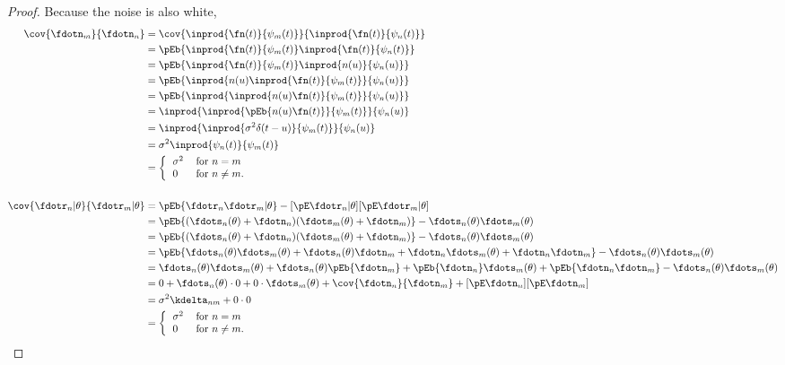 {\begin{proof}
Because the noise is also white,
\begin{align*}
   \cov{\fdotn_m}{\fdotn_n}
      &= \cov{\inprod{\fn(t)}{\psi_m(t)}}{\inprod{\fn(t)}{\psi_n(t)}}
    \\&= \pEb{\inprod{\fn(t)}{\psi_m(t)} \inprod{\fn(t)}{\psi_n(t)}}
    \\&= \pEb{\inprod{\fn(t)}{\psi_m(t)} \inprod{n(u)}{\psi_n(u)}}
    \\&= \pEb{ \inprod{n(u)\inprod{\fn(t)}{\psi_m(t)}}{\psi_n(u)}}
    \\&= \pEb{ \inprod{\inprod{n(u)\fn(t)}{\psi_m(t)}}{\psi_n(u)}}
    \\&= \inprod{\inprod{\pEb{ n(u)\fn(t)}}{\psi_m(t)}}{\psi_n(u)}
    \\&= \inprod{\inprod{\sigma^2 \delta(t-u)}{\psi_m(t)}}{\psi_n(u)}
    \\&= \sigma^2 \inprod{\psi_n(t)}{\psi_m(t)}
    \\&= \left\{
          \begin{tabular}{ll}
             $\sigma^2$ & for $n=m$ \\
             $0$   & for $n\ne m$.
          \end{tabular}
          \right.
\\
\\
   \cov{\fdotr_n|\theta}{\fdotr_m|\theta }
      &= \pEb{\fdotr_n \fdotr_m |\theta} - [\pE\fdotr_n|\theta][\pE\fdotr_m|\theta ]
    \\&= \pEb{(\fdots_n(\theta) +\fdotn_n)(\fdots_m(\theta) +\fdotn_m)} - \fdots_n(\theta) \fdots_m(\theta)
    \\&= \pEb{(\fdots_n(\theta) +\fdotn_n)(\fdots_m(\theta) +\fdotn_m)} - \fdots_n(\theta) \fdots_m(\theta)
    \\&= \pEb{\fdots_n(\theta) \fdots_m(\theta) +\fdots_n(\theta) \fdotn_m+ \fdotn_n\fdots_m(\theta) +\fdotn_n\fdotn_m } - \fdots_n(\theta) \fdots_m(\theta)
    \\&= \fdots_n(\theta) \fdots_m(\theta) + \fdots_n(\theta) \pEb{\fdotn_m}+ \pEb{\fdotn_n}\fdots_m(\theta) +\pEb{\fdotn_n\fdotn_m}  - \fdots_n(\theta) \fdots_m(\theta)
    \\&= 0 + \fdots_n(\theta) \cdot0 + 0\cdot\fdots_m(\theta) + \cov{\fdotn_n}{\fdotn_m}+[\pE\fdotn_n][\pE\fdotn_m]
    \\&= \sigma^2 \kdelta_{nm} + 0\cdot0
    \\&= \left\{
          \begin{tabular}{ll}
             $\sigma^2$ & for $n=m$ \\
             $0$   & for $n\ne m$.
          \end{tabular}
          \right.
\end{align*}
\end{proof}


}
